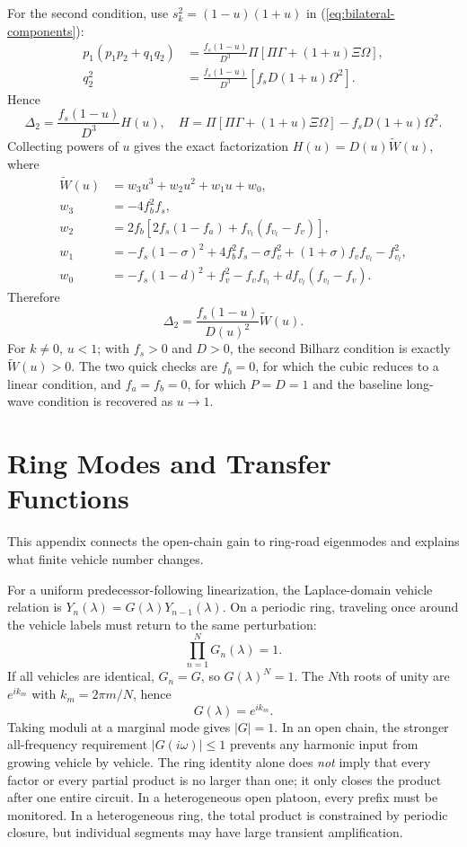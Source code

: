 \documentclass[11pt,a4paper,openany]{book}
\numberwithin{equation}{chapter}
\numberwithin{figure}{chapter}
\numberwithin{table}{chapter}
\newcommand{\chapterguide}[1]{\begin{tcolorbox}[keybox,title=Chapter guide]#1\end{tcolorbox}}
\begin{document}
For the second condition, use $s_k^2=(1-u)(1+u)$ in (\ref{eq:bilateral-components}):
\begin{align}
p_1(p_1p_2+q_1q_2)&=\frac{f_s(1-u)}{D^3}\Pi[\Pi\Gamma+(1+u)\Xi\Omega],\\
q_2^2&=\frac{f_s(1-u)}{D^3}[f_sD(1+u)\Omega^2].
\end{align}
Hence
\begin{equation}
\Delta_2=\frac{f_s(1-u)}{D^3}H(u),\quad
H=\Pi[\Pi\Gamma+(1+u)\Xi\Omega]-f_sD(1+u)\Omega^2.
\end{equation}
Collecting powers of $u$ gives the exact factorization $H(u)=D(u)\widetilde W(u)$, where
\begin{align}
\widetilde W(u)&=w_3u^3+w_2u^2+w_1u+w_0,\\
w_3&=-4f_b^2f_s,\\
w_2&=2f_b[2f_s(1-f_a)+f_{v_l}(f_{v_l}-f_v)],\\
w_1&=-f_s(1-\sigma)^2+4f_b^2f_s-\sigma f_v^2+(1+\sigma)f_vf_{v_l}-f_{v_l}^2,\\
w_0&=-f_s(1-d)^2+f_v^2-f_vf_{v_l}+df_{v_l}(f_{v_l}-f_v).
\end{align}
Therefore
\begin{equation}
\boxed{\Delta_2=\frac{f_s(1-u)}{D(u)^2}\widetilde W(u).}
\end{equation}
For $k\ne0$, $u<1$; with $f_s>0$ and $D>0$, the second Bilharz condition is exactly $\widetilde W(u)>0$. The two quick checks are $f_b=0$, for which the cubic reduces to a linear condition, and $f_a=f_b=0$, for which $P=D=1$ and the baseline long-wave condition is recovered as $u\to1$.

\chapter{Ring Modes and Transfer Functions}
\chapterguide{This appendix connects the open-chain gain to ring-road eigenmodes and explains what finite vehicle number changes.}

For a uniform predecessor-following linearization, the Laplace-domain vehicle relation is $Y_n(\lambda)=G(\lambda)Y_{n-1}(\lambda)$. On a periodic ring, traveling once around the vehicle labels must return to the same perturbation:
\begin{equation}
\prod_{n=1}^NG_n(\lambda)=1.
\end{equation}
If all vehicles are identical, $G_n=G$, so $G(\lambda)^N=1$. The $N$th roots of unity are $e^{ik_m}$ with $k_m=2\pi m/N$, hence
\begin{equation}
G(\lambda)=e^{ik_m}.
\end{equation}
Taking moduli at a marginal mode gives $|G|=1$. In an open chain, the stronger all-frequency requirement $|G(i\omega)|\le1$ prevents any harmonic input from growing vehicle by vehicle. The ring identity alone does \emph{not} imply that every factor or every partial product is no larger than one; it only closes the product after one entire circuit. In a heterogeneous open platoon, every prefix must be monitored. In a heterogeneous ring, the total product is constrained by periodic closure, but individual segments may have large transient amplification.
\end{document}
